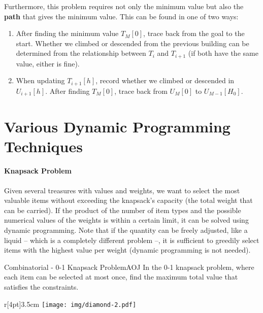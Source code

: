 Furthermore, this problem requires not only the minimum value but also the \textbf{path} that gives the minimum value. This can be found in one of two ways:
\begin{enumerate}
\setlength{\itemsep}{0pt}
\item After finding the minimum value $T_M[0]$, trace back from the goal to the start.
Whether we climbed or descended from the previous building can be determined from the relationship between $T_i$ and $T_{i+1}$ (if both have the same value, either is fine).
\item When updating $T_{i+1}[h]$, record whether we climbed or descended in $U_{i+1}[h]$. After finding $T_{M}[0]$, trace back from $U_{M}[0]$ to $U_{M-1}[H_0]$.
\end{enumerate}
\section{Various Dynamic Programming Techniques}

\paragraph{Knapsack Problem}

Given several treasures with values and weights, we want to select the most valuable items without exceeding the knapsack's capacity (the total weight that can be carried). If the product of the number of item types and the possible numerical values of the weights is within a certain limit, it can be solved using dynamic programming. Note that if the quantity can be freely adjusted, like a liquid -- which is a completely different problem --, it is sufficient to greedily select items with the highest value per weight (dynamic programming is not needed).

\begin{pbox}{Combinatorial - 0-1 Knapsack Problem}{AOJ}
In the 0-1 knapsack problem, where each item can be selected at most once, find the maximum total value that satisfies the constraints.

\end{pbox}

\begin{wrapfigure}[4]{r}[4pt]{3.5cm}
\texttt{[image: img/diamond-2.pdf]}
\end{wrapfigure}

